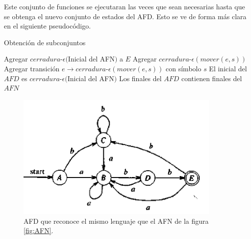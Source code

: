 \documentclass[titlepage]{article}
\begin{document}
Este conjunto de funciones se ejecutaran las veces que sean necesarias hasta que se obtenga el nuevo conjunto de estados del AFD. Esto se ve de forma más clara en el siguiente pseudocódigo.
\begin{algorithm}
	\caption{Obtención de subconjuntos}
	\begin{algorithmic} 
		\STATE Agregar $cerradura$-$\epsilon($Inicial del AFN$)$ a $E$
		\STATE Agregar $cerradura$-$\epsilon(mover(e, s))$
		\STATE Agregar transición $e \rightarrow cerradura$-$\epsilon(mover(e, s))$ con símbolo $s$
		\ENDFOR
		\ENDFOR
		\STATE El inicial del $AFD$ es $cerradura$-$\epsilon($Inicial del AFN$)$
		\STATE Los finales del $AFD$ contienen finales del $AFN$
	\end{algorithmic}
\end{algorithm} 

\begin{figure}[H]
        \begin{center}
        \includegraphics[width=10cm]{AFD.png}
        \caption{AFD que reconoce el mismo lenguaje que el AFN de la figura \ref{fig:AFN}.}
        \label{fig:AFD}
        \end{center}
    \end{figure}
\end{document}
